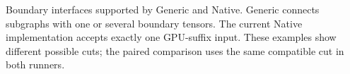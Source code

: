 Boundary interfaces supported by Generic and Native. Generic connects subgraphs with one or several boundary tensors. The current Native implementation accepts exactly one GPU-suffix input. These examples show different possible cuts; the paired comparison uses the same compatible cut in both runners.
